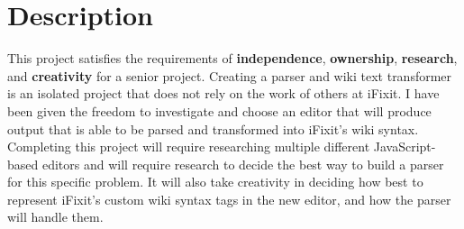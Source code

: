 \documentclass[letterpaper]{article}
\begin{document}
\section{Description}

This project satisfies the requirements of \textbf{independence}, \textbf{ownership}, \textbf{research}, and \textbf{creativity} for a senior project. Creating a parser and wiki text transformer is an isolated project that does not rely on the work of others at iFixit. I have been given the freedom to investigate and choose an editor that will produce output that is able to be parsed and transformed into iFixit's wiki syntax. Completing this project will require researching multiple different JavaScript-based editors and will require research to decide the best way to build a parser for this specific problem. It will also take creativity in deciding how best to represent iFixit's custom wiki syntax tags in the new editor, and how the parser will handle them.
\end{document}
